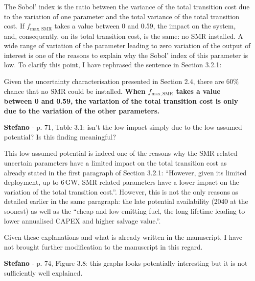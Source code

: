 \documentclass[12pt,a4paper]{article}
\begin{document}
\noindent The Sobol' index is the ratio between the variance of the total transition cost due to the variation of one parameter and the total variance of the total transition cost. If $f_{\mathrm{max,SMR}}$ takes a value between 0 and 0.59, the impact on the system, and, consequently, on its total transition cost, is the same: no SMR installed. A wide range of variation of the parameter leading to zero variation of the output of interest is one of the reasons to explain why the Sobol' index of this parameter is low. To clarify this point, I have rephrased the sentence {\color{blue}in Section 3.2.1}:

\begin{mdframed}[style=manuscript] %
Given the uncertainty characterisation presented in Section 2.4, there are 60\% chance that no SMR could be installed. \textbf{When $f_{\mathrm{max,SMR}}$ takes a value between 0 and 0.59, the variation of the total transition cost is only due to the variation of the other parameters. }
\end{mdframed}

\begin{mdframed}[style=comment] %
{\color{orange} \textbf{Stefano}} - p. 71, Table 3.1: isn’t the low impact simply due to the low assumed potential? Is this finding meaningful?
\end{mdframed}

\noindent This low assumed potential is indeed one of the reasons why the SMR-related uncertain parameters have a limited impact on the total transition cost as already stated in the first paragraph of Section 3.2.1: ``However, given its limited deployment, up to 6\,GW, SMR-related parameters have a lower impact on the variation of the total transition cost.''. However, this is not the only reasons as detailed earlier in the same paragraph: the late potential availability (2040 at the soonest) as well as the ``cheap and low-emitting fuel, the long lifetime leading to lower annualised CAPEX and higher salvage value.''. 

Given these explanations and what is already written in the manuscript, I have not brought further modification to the manuscript in this regard.

\begin{mdframed}[style=comment] %
{\color{orange} \textbf{Stefano}} - p. 74, Figure 3.8: this graphs looks potentially interesting but it is not sufficiently well explained.
\end{mdframed}
\end{document}
